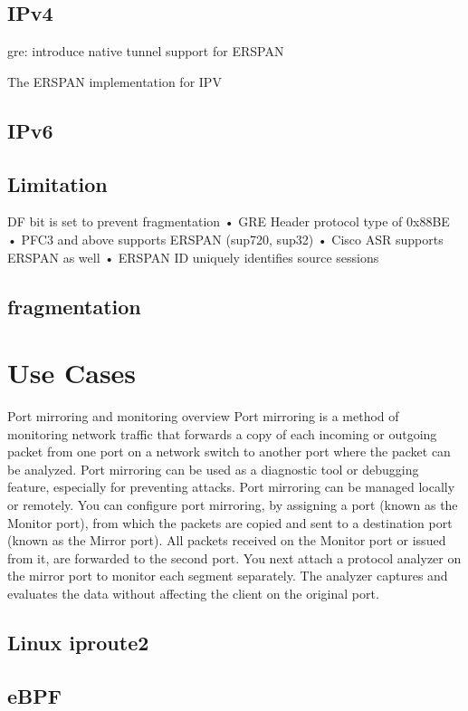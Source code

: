 \documentclass{sigplanconf}
\begin{document}
\subsection{IPv4}

gre: introduce native tunnel support for ERSPAN

The ERSPAN implementation for IPV
\subsection{IPv6}
\subsection{Limitation}
DF bit is set to prevent fragmentation
• GRE Header protocol type of 0x88BE
• PFC3 and above supports ERSPAN (sup720, sup32)
• Cisco ASR supports ERSPAN as well
• ERSPAN ID uniquely identifies source sessions


\subsection{fragmentation}
\section{Use Cases}
Port mirroring and monitoring overview
Port mirroring is a method of monitoring network traffic that forwards a copy of each incoming or outgoing packet from one port on a network switch to another port where the packet can be analyzed. Port mirroring can be used as a diagnostic tool or debugging feature, especially for preventing attacks. Port mirroring can be managed locally or remotely.
You can configure port mirroring, by assigning a port (known as the Monitor port), from which the packets are copied and sent to a destination port (known as the Mirror port). All packets received on the Monitor port or issued from it, are forwarded to the second port. You next attach a protocol analyzer on the mirror port to monitor each segment separately. The analyzer captures and evaluates the data without affecting the client on the original port.

\subsection{Linux iproute2}\label{iproute2}
\subsection{eBPF}\label{ebpf}
\end{document}
